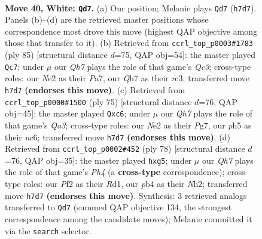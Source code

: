 \documentclass[11pt]{article}
\begin{document}
\clearpage

\begin{figure}[p]\centering
\begin{subfigure}{0.46\textwidth}\centering
\resizebox{\linewidth}{!}{%
\newchessgame
\chessboard[
  setfen={1r6/2R4Q/p2p1kp1/3qrn1p/1p2p2P/8/4NPP1/R4K2 w - - 6 40},
  showmover=false,
  pgfstyle=straightmove, color=movearrow, markmove={h7-d7}
]}
\caption{}
\end{subfigure}\hfill
\begin{subfigure}{0.46\textwidth}\centering
\resizebox{\linewidth}{!}{%
\newchessgame
\chessboard[
  setfen={5r1k/p5p1/2q1p2p/2r5/2p1P2P/2R3P1/P1QR1PK1/8 b - - 0 43},
  showmover=false,
  pgfstyle=straightmove, color=movearrow, markmove={c6-c7}
]}
\caption{}
\end{subfigure}
\\[4pt]
\begin{subfigure}{0.46\textwidth}\centering
\resizebox{\linewidth}{!}{%
\newchessgame
\chessboard[
  setfen={6k1/3r1pp1/q1N5/3p3p/P1r5/5P1P/R5P1/3QR2K b - - 0 38},
  showmover=false,
  pgfstyle=straightmove, color=movearrow, markmove={a6-c6}
]}
\caption{}
\end{subfigure}\hfill
\begin{subfigure}{0.46\textwidth}\centering
\resizebox{\linewidth}{!}{%
\newchessgame
\chessboard[
  setfen={2r1rk2/1R6/5np1/p1q1p1p1/P4p1P/8/1Q3P1N/3R2K1 w - - 0 40},
  showmover=false,
  pgfstyle=straightmove, color=movearrow, markmove={h4-g5}
]}
\caption{}
\end{subfigure}
\caption{\textbf{Move 40, White: \texttt{Qd7}.} (a) Our position; Melanie plays \texttt{Qd7} (\texttt{h7d7}). Panels (b)--(d) are the retrieved master positions whose correspondence most drove this move (highest QAP objective among those that transfer to it). (b) Retrieved from \texttt{ccrl\_top\_p0003\#1783} (ply 85) [structural distance $d$=75, QAP obj=54]: the master played \texttt{Qc7}; under $\mu$ our \emph{Qh7} plays the role of that game's \emph{Qc3}; cross-type roles: our \emph{N}e2 as their \emph{P}a7, our \emph{Q}h7 as their \emph{r}c3; transferred move \texttt{h7d7} \textbf{(endorses this move)}. (c) Retrieved from \texttt{ccrl\_top\_p0000\#1500} (ply 75) [structural distance $d$=76, QAP obj=45]: the master played \texttt{Qxc6}; under $\mu$ our \emph{Qh7} plays the role of that game's \emph{Qa3}; cross-type roles: our \emph{N}e2 as their \emph{P}g7, our \emph{p}h5 as their \emph{n}c6; transferred move \texttt{h7d7} \textbf{(endorses this move)}. (d) Retrieved from \texttt{ccrl\_top\_p0002\#452} (ply 78) [structural distance $d$=76, QAP obj=35]: the master played \texttt{hxg5}; under $\mu$ our \emph{Qh7} plays the role of that game's \emph{Ph4} (a \textbf{cross-type} correspondence); cross-type roles: our \emph{P}f2 as their \emph{R}d1, our \emph{p}b4 as their \emph{N}h2; transferred move \texttt{h7d7} \textbf{(endorses this move)}. Synthesis: 3 retrieved analogs transferred to \texttt{Qd7} (summed QAP objective 134, the strongest correspondence among the candidate moves); Melanie committed it via the \texttt{search} selector.}
\label{fig:thought-m78}
\end{figure}
\end{document}

